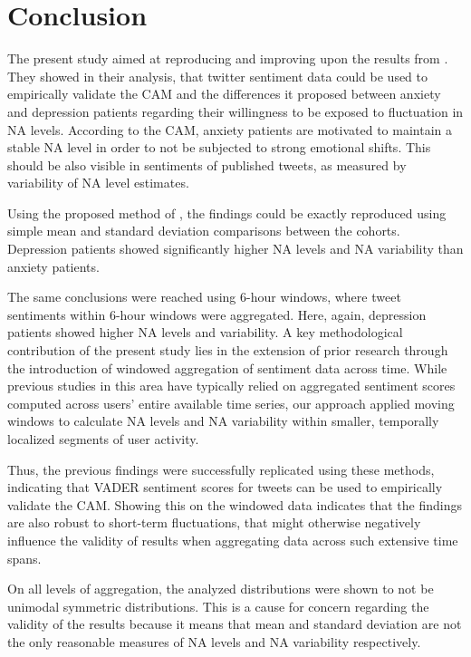 
\section{Conclusion}
\label{sec:conclusions}

The present study aimed at reproducing and improving upon the results from \citet{rutter2024}. They showed in their analysis, that twitter sentiment data could be used to empirically validate the CAM and the differences it proposed between anxiety and depression patients regarding their willingness to be exposed to fluctuation in NA levels. According to the CAM, anxiety patients are motivated to maintain a stable NA level in order to not be subjected to strong emotional shifts. This should be also visible in sentiments of published tweets, as measured by variability of NA level estimates.

Using the proposed method of \citet{rutter2024}, the findings could be exactly reproduced using simple mean and standard deviation comparisons between the cohorts. Depression patients showed significantly higher NA levels and NA variability than anxiety patients.

The same conclusions were reached using 6-hour windows, where tweet sentiments within 6-hour windows were aggregated. Here, again, depression patients showed higher NA levels and variability. A key methodological contribution of the present study lies in the extension of prior research through the introduction of windowed aggregation of sentiment data across time. While previous studies in this area have typically relied on aggregated sentiment scores computed across users' entire available time series, our approach applied moving windows to calculate NA levels and NA variability within smaller, temporally localized segments of user activity.

Thus, the previous findings were successfully replicated using these methods, indicating that VADER sentiment scores for tweets can be used to empirically validate the CAM. Showing this on the windowed data indicates that the findings are also robust to short-term fluctuations, that might otherwise negatively influence the validity of results when aggregating data across such extensive time spans.

On all levels of aggregation, the analyzed distributions were shown to not be unimodal symmetric distributions. This is a cause for concern regarding the validity of the results because it means that mean and standard deviation are not the only reasonable measures of NA levels and NA variability respectively. 

